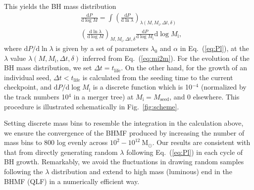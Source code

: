 \documentclass[nolinenumbers,preprint2,tighten]{aastex631}
\newcommand{\Msun}{\mathrm{M_\odot}}
\newcommand{\tlife}{t_\mathrm{life}}
\newcommand{\D}{\mathrm{d}}
\begin{document}
\begin{CJK*}{UTF8}{gbsn}
This yields the BH mass distribution 
\begin{align}
  \label{eq:dpdm}
  & \frac{\D P}{\D \log M} = \int_{}^{} 
   \left(\frac{\D P}{\D \ln \lambda}\right)_{\lambda(M, M_\mathrm{i},\Delta t, \delta)} \nonumber \\
  & \left(\frac{\D \ln \lambda}{\D \log M} \right)_{M, M_\mathrm{i},\Delta t, \delta}
  \frac{\D P}{\D \log M_\mathrm{i}} \D\log M_\mathrm{i},
\end{align}
where ${\D P}/{\D \ln\lambda}$ is given by a set of parameters $\lambda_0$ and $\alpha$ in Eq.~(\ref{eq:Pl}), 
at the $\lambda$ value $\lambda\left(M, M_\mathrm{i},\Delta t, \delta\right)$ inferred from Eq.~(\ref{eq:mi2m}).
For the evolution of the BH mass distribution, we set $\Delta t=\tlife$.
On the other hand, for the growth of an individual seed, 
$\Delta t < \tlife$ is calculated from the seeding time to the current checkpoint,
and $ \D P/\D \log M_\mathrm{i}$ is a discrete function which is 10$^{-4}$ 
(normalized by the track numbers 10$^4$ in a merger tree) at $M_\mathrm{i} = M_\mathrm{seed}$, 
and 0 elsewhere.
This procedure is illustrated schematically in Fig.~\ref{fig:scheme}. 


Setting discrete mass bins to resemble the integration in the calculation above, 
we ensure the convergence of the BHMF produced by increasing the number of mass bins to 800 log evenly across $10^2-10^{12}~\Msun$. 
Our results are consistent with that from directly generating random $\lambda$ 
following Eq.~(\ref{eq:Pl}) in each cycle of BH growth. 
Remarkably, we avoid the fluctuations in drawing random samples following the $\lambda$ distribution 
and extend to high mass (luminous) end in the BHMF (QLF) in a numerically efficient way.


\vspace{2mm}

\end{CJK*}
\end{document}

